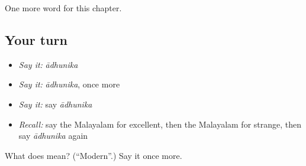 \begin{grammarlens}[title={What you've built}]
One more word for this chapter.
\end{grammarlens}

\subsection*{Your turn}
\begin{itemize}
\raggedright
  \item \emph{Say it:} \emph{ādhunika}
  \item \emph{Say it:} \emph{ādhunika}, once more
  \item \emph{Say it:} say \emph{ādhunika}
  \item \emph{Recall:} say the Malayalam for excellent, then the Malayalam for strange, then say \emph{ādhunika} again
\end{itemize}

\begin{tcolorbox}[breakable,colback=teal!4,colframe=teal!35!black,title={Before you move on}]
What does  mean? (\textquotedblleft{}Modern\textquotedblright{}.) Say it once more.
\end{tcolorbox}
